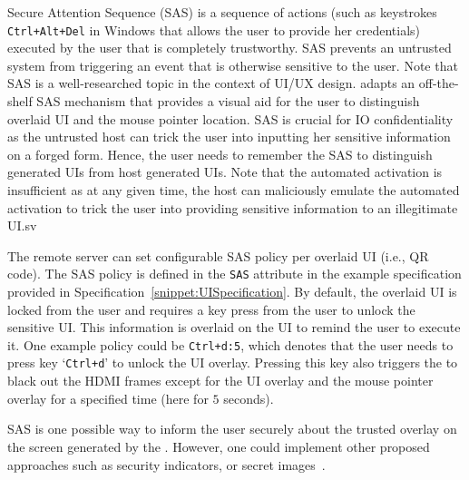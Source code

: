 Secure Attention Sequence (SAS) is a sequence of actions (such as keystrokes \texttt{Ctrl+Alt+Del} in Windows that allows the user to provide her credentials) executed by the user that is completely trustworthy. SAS prevents an untrusted system from triggering an event that is otherwise sensitive to the user. Note that SAS is a well-researched topic in the context of UI/UX design. \name adapts an off-the-shelf SAS mechanism that provides a visual aid for the user to distinguish overlaid UI and the mouse pointer location. SAS is crucial for IO confidentiality as the untrusted host can trick the user into inputting her sensitive information on a forged form. Hence, the user needs to remember the SAS to distinguish \device generated UIs from host generated UIs. Note that the automated activation is insufficient as at any given time, the host can maliciously emulate the automated activation to trick the user into providing sensitive information to an illegitimate UI.sv

 The remote server can set configurable SAS policy per overlaid UI (i.e., QR code). The SAS policy is defined in the \texttt{SAS} attribute in the example specification provided in Specification~\ref{snippet:UISpecification}. By default, the overlaid UI is locked from the user and requires a key press from the user to unlock the sensitive UI. This information is overlaid on the UI to remind the user to execute it. One example policy could be \texttt{Ctrl+d:5}, which denotes that the user needs to press key `\texttt{Ctrl+d}' to unlock the UI overlay. Pressing this key also triggers the \device to black out the HDMI frames except for the UI overlay and the mouse pointer overlay for a specified time (here for $5$ seconds). 

SAS is one possible way to inform the user securely about the trusted overlay on the screen generated by the \device. However, one could implement other proposed approaches such as security indicators, or secret images~\cite{6894474,Marforio2016}.
